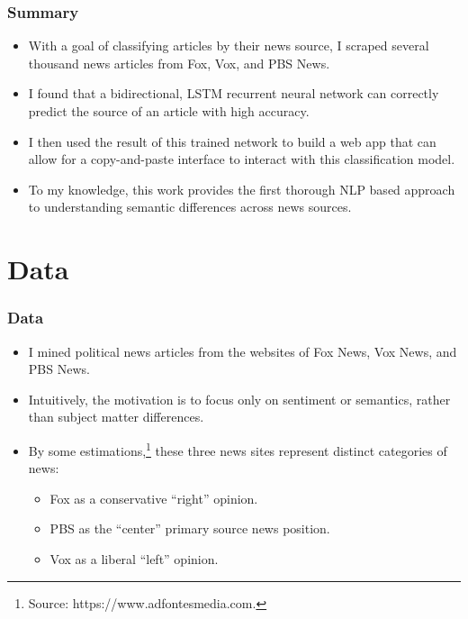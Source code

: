 \documentclass{beamer}
\begin{document}
    \begin{frame}
    	\frametitle{Summary}
    	\begin{itemize}
    		\item With a goal of classifying articles by their news source, I scraped several thousand news articles from Fox, Vox, and PBS News.
    		\item I found that a bidirectional, LSTM recurrent neural network can correctly predict the source of an article with high accuracy. 
    		\item I then used the result of this trained network to build a web app that can allow for a copy-and-paste interface to interact with this classification model. 
    		\item To my knowledge, this work provides the first thorough NLP based approach to understanding semantic differences across news sources. 
    	\end{itemize}
    \end{frame}


\section{Data}

    \begin{frame}
    	\frametitle{Data}
    	\begin{itemize}
    		\item I mined political news articles from the websites of Fox News, Vox News, and PBS News. 
    		\item Intuitively, the motivation is to focus only on sentiment or semantics, rather than subject matter differences.
    		\item By some estimations,\footnote{Source: https://www.adfontesmedia.com.} these three news sites represent distinct categories of news: 
    		\begin{itemize}
    			\item Fox as a conservative “right” opinion. 
    			\item PBS as the “center” primary source news position. 
    			\item Vox as a liberal “left” opinion.
    		\end{itemize} 
    	\end{itemize}
    \end{frame}
\end{document}
